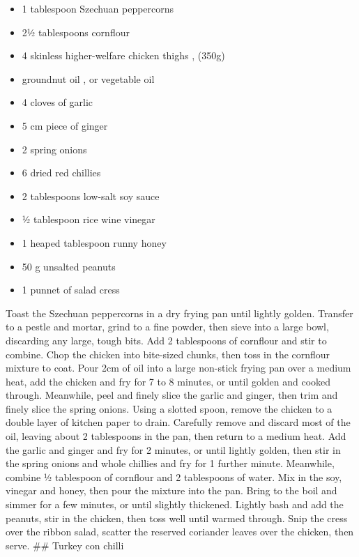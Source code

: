 \documentclass[
]{book}
\providecommand{\tightlist}{%
  \setlength{\itemsep}{0pt}\setlength{\parskip}{0pt}}
\begin{document}
\begin{itemize}
\tightlist
\item
  1 tablespoon Szechuan peppercorns
\item
  2½ tablespoons cornflour
\item
  4 skinless higher-welfare chicken thighs , (350g)
\item
  groundnut oil , or vegetable oil
\item
  4 cloves of garlic
\item
  5 cm piece of ginger
\item
  2 spring onions
\item
  6 dried red chillies
\item
  2 tablespoons low-salt soy sauce
\item
  ½ tablespoon rice wine vinegar
\item
  1 heaped tablespoon runny honey
\item
  50 g unsalted peanuts
\item
  1 punnet of salad cress
\end{itemize}

Toast the Szechuan peppercorns in a dry frying pan until lightly golden. Transfer to a pestle and mortar, grind to a fine powder, then sieve into a large bowl, discarding any large, tough bits.
Add 2 tablespoons of cornflour and stir to combine. Chop the chicken into bite-sized chunks, then toss in the cornflour mixture to coat.
Pour 2cm of oil into a large non-stick frying pan over a medium heat, add the chicken and fry for 7 to 8 minutes, or until golden and cooked through.
Meanwhile, peel and finely slice the garlic and ginger, then trim and finely slice the spring onions.
Using a slotted spoon, remove the chicken to a double layer of kitchen paper to drain. Carefully remove and discard most of the oil, leaving about 2 tablespoons in the pan, then return to a medium heat.
Add the garlic and ginger and fry for 2 minutes, or until lightly golden, then stir in the spring onions and whole chillies and fry for 1 further minute.
Meanwhile, combine ½ tablespoon of cornflour and 2 tablespoons of water. Mix in the soy, vinegar and honey, then pour the mixture into the pan. Bring to the boil and simmer for a few minutes, or until slightly thickened.
Lightly bash and add the peanuts, stir in the chicken, then toss well until warmed through. Snip the cress over the ribbon salad, scatter the reserved coriander leaves over the chicken, then serve.
\#\# Turkey con chilli
\end{document}
